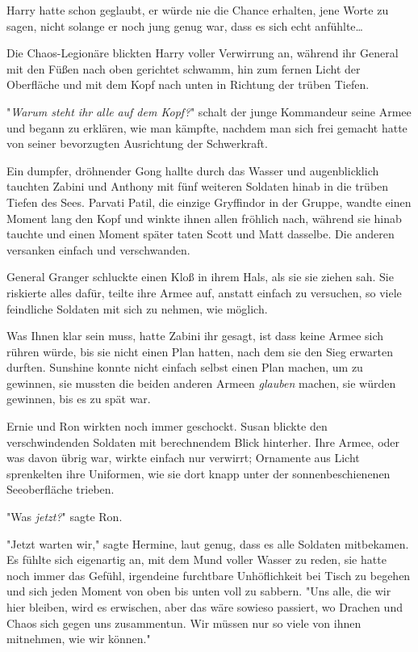 {Harry hatte schon geglaubt, er würde nie die Chance erhalten, jene Worte zu sagen, nicht solange er noch jung genug war, dass es sich echt anfühlte…

Die Chaos-Legionäre blickten Harry voller Verwirrung an, während ihr General mit den Füßen nach oben gerichtet schwamm, hin zum fernen Licht der Oberfläche und mit dem Kopf nach unten in Richtung der trüben Tiefen.

"\emph{Warum steht ihr} \emph{alle} \emph{auf dem Kopf?}" schalt der junge Kommandeur seine Armee und begann zu erklären, wie man kämpfte, nachdem man sich frei gemacht hatte von seiner bevorzugten Ausrichtung der Schwerkraft.

\later

Ein dumpfer, dröhnender Gong hallte durch das Wasser und augenblicklich tauchten Zabini und Anthony mit fünf weiteren Soldaten hinab in die trüben Tiefen des Sees. Parvati Patil, die einzige Gryffindor in der Gruppe, wandte einen Moment lang den Kopf und winkte ihnen allen fröhlich nach, während sie hinab tauchte und einen Moment später taten Scott und Matt dasselbe. Die anderen versanken einfach und verschwanden.

General Granger schluckte einen Kloß in ihrem Hals, als sie sie ziehen sah. Sie riskierte alles dafür, teilte ihre Armee auf, anstatt einfach zu versuchen, so viele feindliche Soldaten mit sich zu nehmen, wie möglich.

Was Ihnen klar sein muss, hatte Zabini ihr gesagt, ist dass keine Armee sich rühren würde, bis sie nicht einen Plan hatten, nach dem sie den Sieg erwarten durften. Sunshine konnte nicht einfach selbst einen Plan machen, um zu gewinnen, sie mussten die beiden anderen Armeen \emph{glauben} machen, sie würden gewinnen, bis es zu spät war.

Ernie und Ron wirkten noch immer geschockt. Susan blickte den verschwindenden Soldaten mit berechnendem Blick hinterher. Ihre Armee, oder was davon übrig war, wirkte einfach nur verwirrt; Ornamente aus Licht sprenkelten ihre Uniformen, wie sie dort knapp unter der sonnenbeschienenen Seeoberfläche trieben.

"Was \emph{jetzt?}" sagte Ron.

"Jetzt warten wir," sagte Hermine, laut genug, dass es alle Soldaten mitbekamen. Es fühlte sich eigenartig an, mit dem Mund voller Wasser zu reden, sie hatte noch immer das Gefühl, irgendeine furchtbare Unhöflichkeit bei Tisch zu begehen und sich jeden Moment von oben bis unten voll zu sabbern. "Uns alle, die wir hier bleiben, wird es erwischen, aber das wäre sowieso passiert, wo Drachen und Chaos sich gegen uns zusammentun. Wir müssen nur so viele von ihnen mitnehmen, wie wir können."

}
